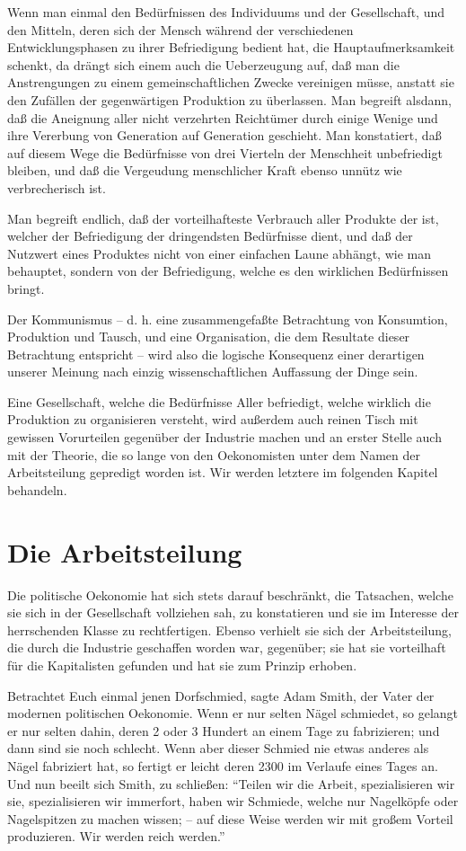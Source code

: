 \documentclass{scrbook}
\begin{document}
Wenn man einmal den Bedürfnissen des Individuums und der Gesellschaft, und den Mitteln, deren sich der Mensch während der verschiedenen Entwicklungsphasen zu ihrer Befriedigung bedient hat, die Hauptaufmerksamkeit schenkt, da drängt sich einem auch die Ueberzeugung auf, daß man die Anstrengungen zu einem gemeinschaftlichen Zwecke vereinigen müsse, anstatt sie den Zufällen der gegenwärtigen Produktion zu überlassen. Man begreift alsdann, daß die Aneignung aller nicht verzehrten Reichtümer durch einige Wenige und ihre Vererbung von Generation auf Generation geschieht. Man konstatiert, daß auf diesem Wege die Bedürfnisse von drei Vierteln der Menschheit unbefriedigt bleiben, und daß die Vergeudung menschlicher Kraft ebenso unnütz wie verbrecherisch ist.

Man begreift endlich, daß der vorteilhafteste Verbrauch aller Produkte der ist, welcher der Befriedigung der dringendsten Bedürfnisse dient, und daß der Nutzwert eines Produktes nicht von einer einfachen Laune abhängt, wie man behauptet, sondern von der Befriedigung, welche es den wirklichen Bedürfnissen bringt.

Der Kommunismus – d. h. eine zusammengefaßte Betrachtung von Konsumtion, Produktion und Tausch, und eine Organisation, die dem Resultate dieser Betrachtung entspricht – wird also die logische Konsequenz einer derartigen unserer Meinung nach einzig wissenschaftlichen Auffassung der Dinge sein.

Eine Gesellschaft, welche die Bedürfnisse Aller befriedigt, welche wirklich die Produktion zu organisieren versteht, wird außerdem auch reinen Tisch mit gewissen Vorurteilen gegenüber der Industrie machen und an erster Stelle auch mit der Theorie, die so lange von den Oekonomisten unter dem Namen der Arbeitsteilung gepredigt worden ist. Wir werden letztere im folgenden Kapitel behandeln.

\chapter{Die Arbeitsteilung}

Die politische Oekonomie hat sich stets darauf beschränkt, die Tatsachen, welche sie sich in der Gesellschaft vollziehen sah, zu konstatieren und sie im Interesse der herrschenden Klasse zu rechtfertigen. Ebenso verhielt sie sich der Arbeitsteilung, die durch die Industrie geschaffen worden war, gegenüber; sie hat sie vorteilhaft für die Kapitalisten gefunden und hat sie zum Prinzip erhoben.

Betrachtet Euch einmal jenen Dorfschmied, sagte Adam Smith, der Vater der modernen politischen Oekonomie. Wenn er nur selten Nägel schmiedet, so gelangt er nur selten dahin, deren 2 oder 3 Hundert an einem Tage zu fabrizieren; und dann sind sie noch schlecht. Wenn aber dieser Schmied nie etwas anderes als Nägel fabriziert hat, so fertigt er leicht deren 2300 im Verlaufe eines Tages an. Und nun beeilt sich Smith, zu schließen: ``Teilen wir die Arbeit, spezialisieren wir sie, spezialisieren wir immerfort, haben wir Schmiede, welche nur Nagelköpfe oder Nagelspitzen zu machen wissen; – auf diese Weise werden wir mit großem Vorteil produzieren. Wir werden reich werden.''
\end{document}

